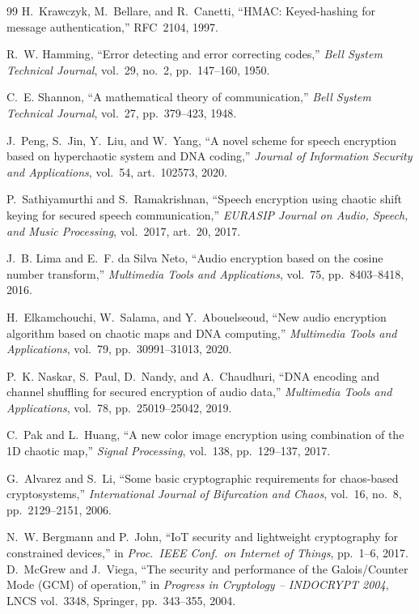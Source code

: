 \documentclass[pdflatex,sn-mathphys-num]{sn-jnl}%
\theoremstyle{thmstyleone}%
\theoremstyle{thmstyletwo}%
\theoremstyle{thmstylethree}%
\begin{document}
\begin{thebibliography}{99}
 H.~Krawczyk, M.~Bellare, and R.~Canetti, ``HMAC: Keyed-hashing for message authentication,'' RFC~2104, 1997.

 R.~W. Hamming, ``Error detecting and error correcting codes,'' \textit{Bell System Technical Journal}, vol.~29, no.~2, pp.~147--160, 1950.

 C.~E. Shannon, ``A mathematical theory of communication,'' \textit{Bell System Technical Journal}, vol.~27, pp.~379--423, 1948.

 J.~Peng, S.~Jin, Y.~Liu, and W.~Yang, ``A novel scheme for speech encryption based on hyperchaotic system and DNA coding,'' \textit{Journal of Information Security and Applications}, vol.~54, art.~102573, 2020.

 P.~Sathiyamurthi and S.~Ramakrishnan, ``Speech encryption using chaotic shift keying for secured speech communication,'' \textit{EURASIP Journal on Audio, Speech, and Music Processing}, vol.~2017, art.~20, 2017.

 J.~B. Lima and E.~F. da Silva Neto, ``Audio encryption based on the cosine number transform,'' \textit{Multimedia Tools and Applications}, vol.~75, pp.~8403--8418, 2016.

 H.~Elkamchouchi, W.~Salama, and Y.~Abouelseoud, ``New audio encryption algorithm based on chaotic maps and DNA computing,'' \textit{Multimedia Tools and Applications}, vol.~79, pp.~30991--31013, 2020.

 P.~K. Naskar, S.~Paul, D.~Nandy, and A.~Chaudhuri, ``DNA encoding and channel shuffling for secured encryption of audio data,'' \textit{Multimedia Tools and Applications}, vol.~78, pp.~25019--25042, 2019.

 C.~Pak and L.~Huang, ``A new color image encryption using combination of the 1D chaotic map,'' \textit{Signal Processing}, vol.~138, pp.~129--137, 2017.

 G.~Alvarez and S.~Li, ``Some basic cryptographic requirements for chaos-based cryptosystems,'' \textit{International Journal of Bifurcation and Chaos}, vol.~16, no.~8, pp.~2129--2151, 2006.

 N.~W. Bergmann and P.~John, ``IoT security and lightweight cryptography for constrained devices,'' in \textit{Proc.\ IEEE Conf.\ on Internet of Things}, pp.~1--6, 2017.
 D.~McGrew and J.~Viega, ``The security and performance of the Galois/Counter Mode (GCM) of operation,'' in \textit{Progress in Cryptology -- INDOCRYPT 2004}, LNCS vol.~3348, Springer, pp.~343--355, 2004.


\end{thebibliography}
\end{document}
